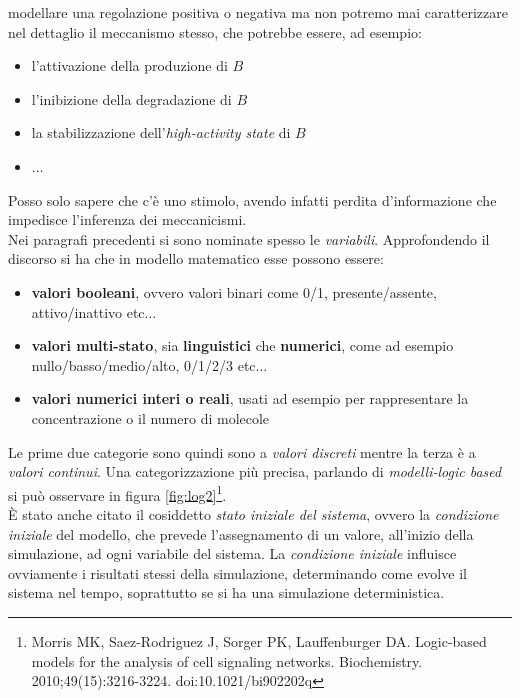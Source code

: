 \documentclass[a4paper,12pt, oneside]{book}
\begin{document}
modellare una regolazione positiva o negativa ma non
potremo mai caratterizzare nel dettaglio il meccanismo stesso, che potrebbe
essere, ad esempio: 
\begin{itemize}
  \item l'attivazione della produzione di $B$
  \item l'inibizione della degradazione di $B$
  \item la stabilizzazione dell'\textit{high-activity state} di $B$
  \item $\ldots$
\end{itemize}
Posso solo sapere che c'è uno stimolo, avendo infatti perdita d'informazione che
impedisce l'inferenza dei meccanicismi. \\
Nei paragrafi precedenti si sono nominate spesso le
\textit{variabili}. Approfondendo il discorso si ha che in modello matematico
esse possono essere:
\begin{itemize}
  \item \textbf{valori booleani}, ovvero valori binari come 0/1,
  presente/assente, attivo/inattivo etc$\ldots$
  \item \textbf{valori multi-stato}, sia \textbf{linguistici} che
  \textbf{numerici}, come ad esempio nullo/basso/medio/alto, 0/1/2/3 etc$\ldots$
  \item \textbf{valori numerici interi o reali}, usati ad esempio per
  rappresentare la concentrazione o il numero di molecole
\end{itemize}
Le prime due categorie sono quindi sono a \textit{valori discreti} mentre la
terza è a \textit{valori continui}. Una categorizzazione più precisa, parlando
di \textit{modelli-logic based} si può osservare in figura
\ref{fig:log2}\footnote{Morris MK, Saez-Rodriguez J, Sorger PK, Lauffenburger
  DA. Logic-based models for the analysis of cell signaling
  networks. Biochemistry. 2010;49(15):3216-3224. doi:10.1021/bi902202q}. \\ 
È stato anche citato il cosiddetto \textit{stato iniziale del sistema}, ovvero
la \textit{condizione iniziale} del modello, che prevede l'assegnamento di un
valore, all'inizio della simulazione, ad ogni variabile del sistema. La
\textit{condizione iniziale} influisce ovviamente i risultati stessi della
simulazione, determinando come evolve il sistema nel tempo, soprattutto se si ha
una simulazione deterministica.
\end{document}
